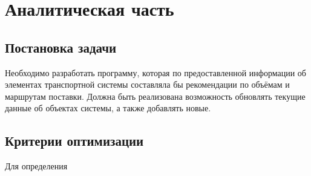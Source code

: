 \section{Аналитическая часть}

\subsection{Постановка задачи}

Необходимо разработать программу, которая по предоставленной информации об элементах транспортной системы составляла бы рекомендации по объёмам и маршрутам поставки.
Должна быть реализована возможность обновлять текущие данные об объектах системы, а также добавлять новые.

\subsection{Критерии оптимизации}
Для определения 

\pagebreak